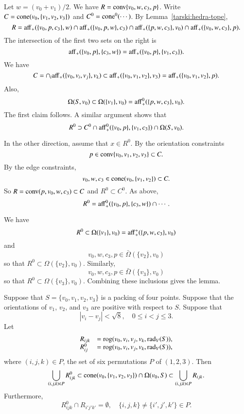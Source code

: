 \begin{tarskidata}
\begin{tarski}
\begin{proved}
Let $w=(v_0+v_1)/2$.  We have $R={\operatorname{conv}}\{v_0,w,c_3,p\}$.
Write $C = {\operatorname{cone}}(v_0,\{v_1,v_2,v_3\})$ and $C^0 = {\operatorname{cone}}^0(\cdots)$.
By Lemma~\ref{tarski:hedra-tope}, 
   $$
   R={\operatorname{aff}}_+(\{v_0,p,c_3\},w)\cap {\operatorname{aff}}_+(\{v_0,p,w\},c_3)\cap
   {\operatorname{aff}}_+(\{p,w,c_3\},v_0)\cap {\operatorname{aff}}_+(\{v_0,w,c_3\},p).
   $$
The intersection of the first two sets on the right is
$$
   {\operatorname{aff}}_+(\{v_0,p\},\{c_3,w\}) = {\operatorname{aff}}_+(\{v_0,p\},\{v_1,c_3\}).
$$
We have
$$
C = \cap_i {\operatorname{aff}}_+(\{v_0,v_i,v_j\},v_k)
  \subset {\operatorname{aff}}_+(\{v_0,v_1,v_2\},v_3) = {\operatorname{aff}}_+(\{v_0,v_1,v_2\},p).
$$
Also,
$$
\Omega(S,v_0)\subset \Omega(\{v_1\},v_0) = {\operatorname{aff}}_+^0(\{p,w,c_3\},v_0).
$$
The first claim follows.
A similar argument shows that
$$
 R^0 \supset C^0\cap
  {\operatorname{aff}}_+^0(\{v_0,p\},\{v_1,c_3\}) \cap
  \Omega(S,v_0).
$$ 

In the other direction, assume that $x\in R^0$.
By the orientation constraints
$$
p\in {\operatorname{conv}}\{v_0,v_1,v_2,v_3\}\subset C.
$$
By the edge constraints,
$$
v_0,w,c_3\in {\operatorname{cone}}(v_0,\{v_1,v_2\}) \subset C.
$$
So $R={\operatorname{conv}}(p,v_0,w,c_3) \subset C$ and $R^0\subset C^0$.
As above,
$$
R^0 = {\operatorname{aff}}^0_+(\{v_0,p\},\{c_3,w\}) \cap \cdots.
$$

We have 
$$R^0\subset \Omega(\{v_1\},v_0) = {\operatorname{aff}}_+^+(\{p,w,c_3\},v_0)$$
and $$v_0,w,c_3,p\in \bar\Omega(\{v_2\},v_0)$$ so that $R^0\subset \Omega(\{v_2\},v_0)$.
Similarly, $$v_0,w,c_3,p\in \bar\Omega(\{v_3\},v_0)$$ so that $R^0\subset \Omega(\{v_3\},v_0)$.
Combining these inclusions gives the lemma.
\swallowed\end{proved}
\end{tarski}




\begin{tarski}

\begin{lemma}
Suppose that $S=\{v_0,v_1,v_2,v_3\}$ is a packing
of four points.  Suppose that 
the orientations of $v_1$, $v_2$, and $v_3$ are positive with respect
to $S$.  Suppose that 
  $$
  |v_i - v_j | < \sqrt8, \quad 0\le i < j \le 3.
  $$
Let 
   $$
   \begin{array}{lll}
   R_{ijk} &= {\operatorname{rog}}(v_0,v_i,v_j,v_k,\operatorname{rad}_V(S)),\\
   R^0_{ij} &= {\operatorname{rog}}(v_0,v_i,v_j,v_k,\operatorname{rad}_V(S)),
   \end{array}
   $$
where $(i,j,k)\in P$,  the set of six permutations $P$ of $(1,2,3)$.
Then
   $$
   \bigcup_{(i,j,k)\in P} R_{ijk}^0\subset
   {\operatorname{cone}}(v_0,\{v_1,v_2,v_3\})\cap \Omega(v_0,S) \subset
   \bigcup_{(i,j,k)\in P} R_{ijk}.
   $$
Furthermore,
   $$
   R_{ijk}^0 \cap R_{i'j'k'} =\emptyset,\quad
   \{i,j,k\}\ne\{i',j',k'\}\in P.
   $$
\end{lemma}


\end{tarski}
\end{tarskidata}
